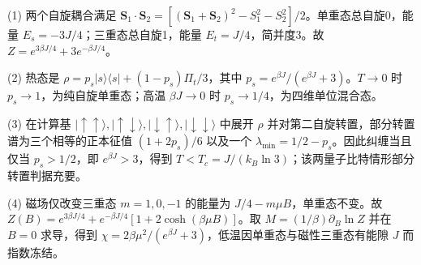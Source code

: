 (1) 两个自旋耦合满足 \(\mathbf S_1\cdot\mathbf S_2=[(\mathbf S_1+\mathbf S_2)^2-S_1^2-S_2^2]/2\)。单重态总自旋0，能量 \(E_s=-3J/4\)；三重态总自旋1，能量 \(E_t=J/4\)，简并度3。故 \(Z=e^{3\beta J/4}+3e^{-\beta J/4}\)。

(2) 热态是 \(\rho=p_s|s\rangle\langle s|+(1-p_s)\Pi_t/3\)，其中 \(p_s=e^{\beta J}/(e^{\beta J}+3)\)。\(T\to0\) 时 \(p_s\to1\)，为纯自旋单重态；高温 \(\beta J\to0\) 时 \(p_s\to1/4\)，为四维单位混合态。

(3) 在计算基 \(|\uparrow\uparrow\rangle,|\uparrow\downarrow\rangle,|\downarrow\uparrow\rangle,|\downarrow\downarrow\rangle\) 中展开 \(\rho\) 并对第二自旋转置，部分转置谱为三个相等的正本征值 \((1+2p_s)/6\) 以及一个 \(\boxed{\lambda_{\min}=1/2-p_s}\)。因此纠缠当且仅当 \(p_s>1/2\)，即 \(e^{\beta J}>3\)，得到 \(\boxed{T<T_c=J/(k_B\ln3)}\)；该两量子比特情形部分转置判据充要。

(4) 磁场仅改变三重态 \(m=1,0,-1\) 的能量为 \(J/4-m\mu B\)，单重态不变。故 \(Z(B)=e^{3\beta J/4}+e^{-\beta J/4}[1+2\cosh(\beta\mu B)]\)。取 \(M=(1/\beta)\partial_B\ln Z\) 并在 \(B=0\) 求导，得到 \(\boxed{\chi=2\beta\mu^2/(e^{\beta J}+3)}\)，低温因单重态与磁性三重态有能隙 \(J\) 而指数冻结。
